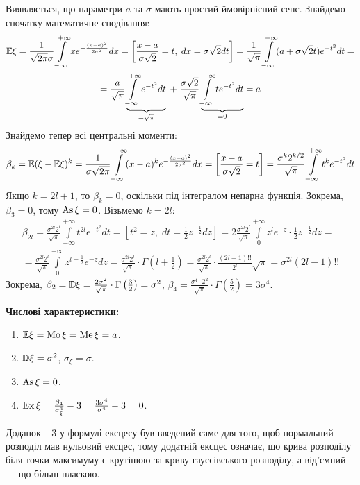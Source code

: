 Виявляється, що параметри $a$ та $\sigma$ мають простий ймовірнісний сенс.
Знайдемо спочатку математичне сподівання:
\begin{gather*}
    \mathbb{E}\xi = 
    \frac{1}{\sqrt{2\pi}\sigma}
    \int\limits_{-\infty}^{+\infty}x e^{-\frac{(x-a)^2}{2\sigma^2}} dx 
    = \left[ \frac{x-a}{\sigma \sqrt{2}} = t, \; dx = \sigma\sqrt{2}dt \right] = 
    \frac{1}{\sqrt{\pi}}\int\limits_{-\infty}^{+\infty} 
    (a + \sigma\sqrt{2}t)e^{-t^2} dt = \\
    =\frac{a}{\sqrt{\pi}}
    \underbrace{\int\limits_{-\infty}^{+\infty}e^{-t^2}dt}_{ = \sqrt{\pi}} \; + \; 
    \frac{\sigma \sqrt{2}}{\sqrt{\pi}} 
    \underbrace{\int\limits_{-\infty}^{+\infty} t e^{-t^2}dt}_{= 0}
    = a
\end{gather*}
Знайдемо тепер всі центральні моменти:
\begin{gather*}
    \beta_k = \mathbb{E}(\xi - \mathbb{E}\xi)^k = 
    \frac{1}{\sigma\sqrt{2\pi}}
    \int\limits_{-\infty}^{+\infty}(x-a)^k 
    e^{-\frac{(x-a)^2}{2\sigma^2}} dx = 
    \left[ \frac{x-a}{\sigma \sqrt{2}} = t\right] 
    =
    \frac{\sigma^k 2^{k/2}}{\sqrt{\pi}}
    \int\limits_{-\infty}^{+\infty}t^k 
    e^{-t^2} dt
\end{gather*}
Якщо $k = 2l + 1$, то $\beta_k = 0$, оскільки під інтегралом непарна функція.
Зокрема, $\beta_3 = 0$, тому $\operatorname{As}\xi = 0$.
Візьмемо $k = 2l$:
\begin{gather*}
    \beta_{2l} = 
    \frac{\sigma^{2l} 2^{l}}{\sqrt{\pi}}
    \int\limits_{-\infty}^{+\infty}t^{2l} 
    e^{-t^2} dt = \left[ t^2 = z, \; dt = \frac{1}{2} z^{-\frac{1}{2}}dz\right] = 
    2\frac{\sigma^{2l}2^l}{\sqrt{\pi}}
    \int\limits_{0}^{+\infty}z^l e^{-z}\cdot \frac{1}{2} z^{-\frac{1}{2}}
    dz = \\
    = \frac{\sigma^{2l}2^l}{\sqrt{\pi}}
    \int\limits_{0}^{+\infty}z^{l-\frac{1}{2}} e^{-z}
    dz = 
    \frac{\sigma^{2l}2^l}{\sqrt{\pi}}\cdot\Gamma\left(l+\frac{1}{2}\right) = 
    \frac{\sigma^{2l}2^l}{\sqrt{\pi}} \cdot \frac{(2l-1)!!}{2^l} \sqrt{\pi} = \sigma^{2l} (2l-1)!!
\end{gather*}
Зокрема, $\beta_2 = \mathbb{D}\xi = \frac{2 \sigma^2}{\sqrt{\pi}}\cdot\Gamma\left(\frac{3}{2}\right) = \sigma^2$,
$\beta_4 = \frac{\sigma^4\cdot2^2}{\sqrt{\pi}}\cdot \Gamma\left(\frac{5}{2}\right) = 3\sigma^4$.

\noindent \textbf{Числові характеристики:}
\begin{enumerate}
    \item $\mathbb{E}\xi = \operatorname{Mo}\xi = \operatorname{Me}\xi = a$.
    \item $\mathbb{D}\xi = \sigma^2$, $\sigma_\xi = \sigma$.
    \item $\operatorname{As}\xi = 0$.
    \item $\operatorname{Ex}\xi = \frac{\beta_4}{\sigma_\xi^4} - 3 = 
    \frac{3\sigma^4}{\sigma^4} - 3 = 0$. 
\end{enumerate}
\begin{remark}
    Доданок $-3$ у формулі ексцесу був введений саме для того, щоб нормальний розподіл мав нульовий ексцес,
    тому додатній ексцес означає, що крива розподілу біля точки максимуму є крутішою за криву гауссівського розподілу,
    а від'ємний --- що більш пласкою.
\end{remark}

